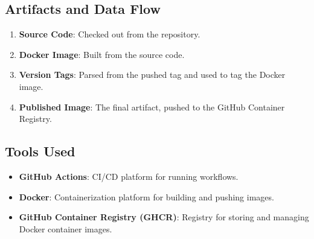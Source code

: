 
\subsection{Artifacts and Data Flow}

\begin{enumerate}
    \item \textbf{Source Code}: Checked out from the repository.
    \item \textbf{Docker Image}: Built from the source code.
    \item \textbf{Version Tags}: Parsed from the pushed tag and used to tag the Docker image.
    \item \textbf{Published Image}: The final artifact, pushed to the GitHub Container Registry.
\end{enumerate}

\subsection{Tools Used}

\begin{itemize}
    \item \textbf{GitHub Actions}: CI/CD platform for running workflows.
    \item \textbf{Docker}: Containerization platform for building and pushing images.
    \item \textbf{GitHub Container Registry (GHCR)}: Registry for storing and managing Docker container images.
\end{itemize}

